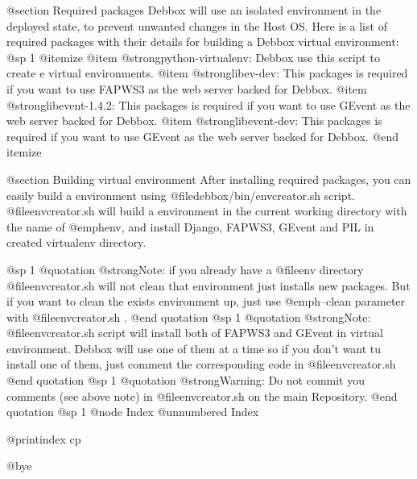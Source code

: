 @section Required packages
Debbox will use an isolated environment in the deployed state, to prevent unwanted changes in the
Host OS. Here is a list of required packages with their details for building a Debbox virtual environment:
@sp 1
@itemize
@item
@strong{python-virtualenv}: Debbox use this script to create e virtual environments.
@item
@strong{libev-dev}: This packages is required if you want to use FAPWS3 as the web server backed for Debbox.
@item
@strong{libevent-1.4.2}: This packages is required if you want to use GEvent as the web server backed for Debbox.
@item
@strong{libevent-dev}: This packages is required if you want to use GEvent as the web server backed for Debbox.
@end itemize

@section Building virtual environment
After installing required packages, you can easily build a environment using @file{debbox/bin/envcreator.sh} script. @file{envcreator.sh}
will build a environment in the current working directory with the name of @emph{env}, and install Django, FAPWS3, GEvent and PIL in created
virtualenv directory.

@sp 1
@quotation
@strong{Note}: if you already have a @file{env} directory @file{envcreator.sh} will not clean that environment just installs new packages. But 
if you want to clean the exists environment up, just use @emph{--clean} parameter with @file{envcreator.sh} .
@end quotation
@sp 1
@quotation
@strong{Note}: @file{envcreator.sh} script will install both of FAPWS3 and GEvent in virtual environment. Debbox will use one of them at a time
so if you don't want tu install one of them, just comment the corresponding code in @file{envcreator.sh}  
@end quotation
@sp 1
@quotation
@strong{Warning}: Do not commit you comments (see above note) in @file{envcreator.sh} on the main Repository.
@end quotation
@sp 1
@node Index
@unnumbered Index

@printindex cp

@bye
